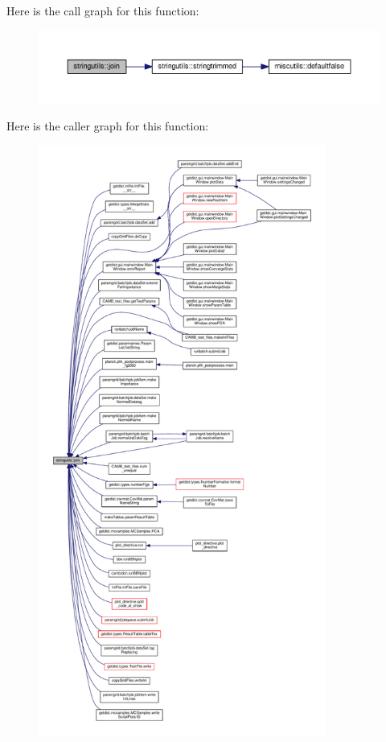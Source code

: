 Here is the call graph for this function\+:
\nopagebreak
\begin{figure}[H]
\begin{center}
\leavevmode
\includegraphics[width=350pt]{namespacestringutils_a29f32cf04e0c44fc8ee8dfa9819b915d_cgraph}
\end{center}
\end{figure}
Here is the caller graph for this function\+:
\nopagebreak
\begin{figure}[H]
\begin{center}
\leavevmode
\includegraphics[height=550pt]{namespacestringutils_a29f32cf04e0c44fc8ee8dfa9819b915d_icgraph}
\end{center}
\end{figure}
\mbox{\label{namespacestringutils_af68508e2bb36d836c0f94f476f728cb3}} 
